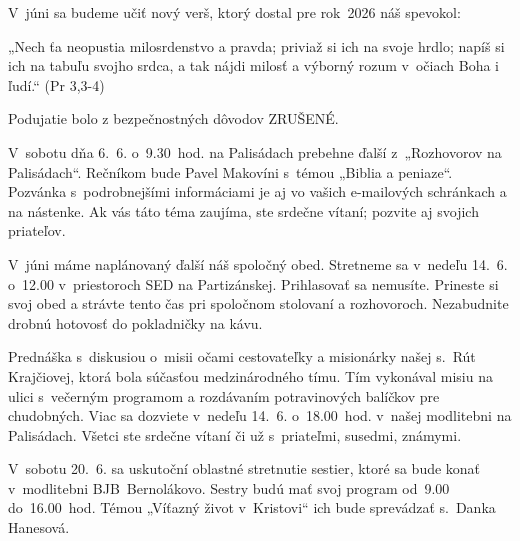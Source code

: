 \def\velkostpisma{10}
\def\velkostriadku{12.5}



V~júni sa budeme učiť nový verš, ktorý dostal pre rok~2026 náš spevokol:

„Nech ťa neopustia milosrdenstvo a pravda; priviaž si ich na svoje hrdlo; napíš si ich na tabuľu svojho srdca, a tak nájdi milosť a výborný rozum v~očiach Boha i ľudí.“ (Pr 3,3-4)




Podujatie bolo z bezpečnostných dôvodov ZRUŠENÉ.


V~sobotu dňa 6.~6. o~9.30~hod. na Palisádach prebehne ďalší z~„Rozhovorov na Palisádach“. Rečníkom bude Pavel Makovíni s~témou „Biblia a peniaze“.
Pozvánka s~podrobnejšími informáciami je aj vo vašich e-mailových schránkach a na nástenke. Ak vás táto téma zaujíma, ste srdečne vítaní; pozvite aj svojich priateľov.


V~júni máme naplánovaný ďalší náš spoločný obed. Stretneme sa v~nedeľu 14.~6. o~12.00 v~priestoroch SED na Partizánskej. Prihlasovať sa nemusíte. Prineste si svoj obed a strávte tento čas pri spoločnom stolovaní a rozhovoroch. Nezabudnite drobnú hotovosť do pokladničky na kávu.


Prednáška s~diskusiou o~misii očami cestovateľky a misionárky našej s.~Rút Krajčiovej, ktorá bola súčasťou medzinárodného tímu. Tím vykonával misiu na ulici s~večerným programom a rozdávaním potravinových balíčkov pre chudobných.
Viac sa dozviete v~nedeľu 14.~6. o~18.00~hod. v~našej modlitebni na Palisádach. Všetci ste srdečne vítaní či už s~priateľmi, susedmi, známymi.


V~sobotu 20.~6. sa uskutoční oblastné stretnutie sestier, ktoré sa bude konať v~modlitebni BJB~Bernolákovo. Sestry budú mať svoj program od~9.00 do~16.00~hod. Témou „Víťazný život v~Kristovi“ ich bude sprevádzať s.~Danka Hanesová.





